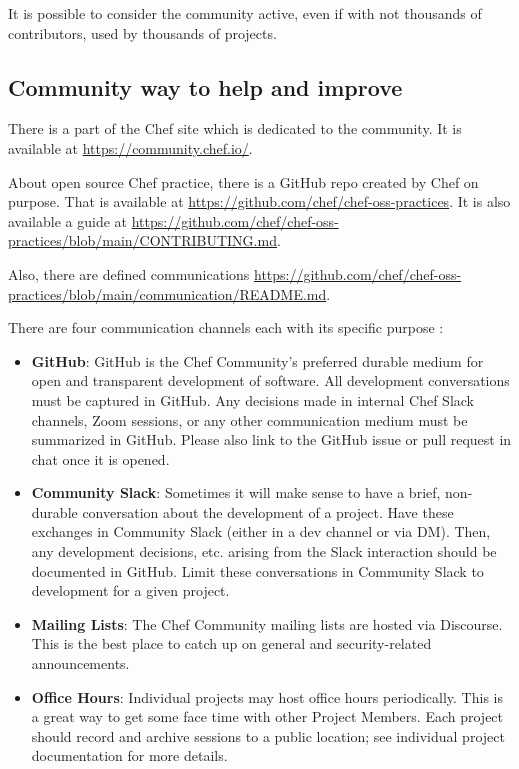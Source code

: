 \documentclass[12pt,a4paper,openright,twoside]{book}
\begin{document}
It is possible to consider the community active, even if with not thousands of contributors, used by thousands of projects.


\subsection{Community way to help and improve}
There is a part of the Chef site which is dedicated to the community.
It is available at \url{https://community.chef.io/}.


About open source Chef practice, there is a GitHub repo created by Chef on purpose.
That is available at \url{https://github.com/chef/chef-oss-practices}. It is also available a guide at \url{https://github.com/chef/chef-oss-practices/blob/main/CONTRIBUTING.md}.


Also, there are defined communications \url{https://github.com/chef/chef-oss-practices/blob/main/communication/README.md}.

There are four communication channels each with its specific purpose \cite{chefGithubOSSCom}:


\begin{itemize}
    \item \textbf{GitHub}: GitHub is the Chef Community's preferred durable medium for open and transparent development of software. All development conversations must be captured in GitHub. Any decisions made in internal Chef Slack channels, Zoom sessions, or any other communication medium must be summarized in GitHub. Please also link to the GitHub issue or pull request in chat once it is opened.
    \item \textbf{Community Slack}: Sometimes it will make sense to have a brief, non-durable conversation about the development of a project. Have these exchanges in Community Slack (either in a dev channel or via DM). Then, any development decisions, etc. arising from the Slack interaction should be documented in GitHub. Limit these conversations in Community Slack to development for a given project.
    \item \textbf{Mailing Lists}: The Chef Community mailing lists are hosted via Discourse. This is the best place to catch up on general and security-related announcements.
    \item \textbf{Office Hours}: Individual projects may host office hours periodically. This is a great way to get some face time with other Project Members. Each project should record and archive sessions to a public location; see individual project documentation for more details.
\end{itemize}
\end{document}
